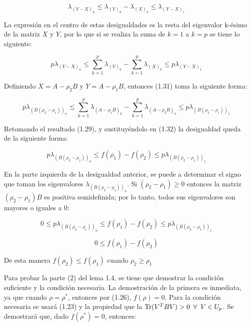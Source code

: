 \begin{equation*}
		\lambda_{(Y-X)_n} \leq \lambda_{(Y)_k} - \lambda_{(X)_k} \leq \lambda_{(Y-X)_1}
\end{equation*}

La expresión en el centro de estas desigualdades es la resta del eigenvalor k-ésimo de la matriz $X$ y $Y$, por lo que si se realiza la suma de $k = 1$ a $k = p$ se tiene lo siguiente:

\begin{equation}\label{eq:2.32}
		p \lambda_{(Y-X)_n} \leq \sum_{k=1}^{p} \lambda_{(Y)_k} - \sum_{k=1}^{p} \lambda_{(X)_k} \leq  p \lambda_{(Y-X)_1}
\end{equation}

Definiendo $X = A - \rho_2 B$ y $Y = A - \rho_1 B$, entonces (1.31) toma la siguiente forma:

\begin{equation}\label{eq:2.33}
    p \lambda_{(B(\rho_2-\rho_1))_n} \leq \sum_{k=1}^{p} \lambda_{(A - \rho_1 B)_k} - \sum_{k=1}^{p} \lambda_{(A - \rho_2 B)_k} \leq  p \lambda_{(B(\rho_2-\rho_1))_1}
\end{equation}

Retomando el resultado (1.29), y sustituyéndolo en (1.32) la desigualdad queda de la siguiente forma:

\begin{equation}\label{eq:2.34}
		p \lambda_{(B (\rho_2 - \rho_1))_n} \leq f(\rho_1) - f(\rho_2) \leq  p \lambda_{(B (\rho_2 - \rho_1))_1}
\end{equation}


En la parte izquierda de la desigualdad anterior, se puede a determinar el signo que toman los eigenvalores $\lambda_{(B (\rho_2 - \rho_1))_n}$. 
Si $(\rho_2- \rho_1) \geq 0$ entonces la matriz $(\rho_2 - \rho_1)B$ es positiva semidefinida; por lo tanto, todos sus eigenvalores son mayores o iguales a 0:

\begin{equation*}
	0 \leq p \lambda_{(B (\rho_2 - \rho_1))_n} \leq f(\rho_1) - f(\rho_2) \leq  p \lambda_{(B (\rho_2 - \rho_1))_1}
\end{equation*}
	
\begin{equation}\label{eq:2.35}
	0 \leq f(\rho_1) - f(\rho_2)
\end{equation}

De esta manera $f(\rho_2)  \leq  f(\rho_1) $ cuando $\rho_2 \geq \rho_1$

Para probar la parte (2) del lema 1.4, se tiene que demostrar la condición suficiente y la condición necesaria. La demostración de la primera es inmediata, ya que cuando $\rho = \rho^*$, entonces por (1.26), $f(\rho) = 0$. Para la condición necesaria se usará (1.23) y la propiedad que la $\operatorname{Tr}(V^T B V) >0 \enspace \forall \enspace V \in U_p$. Se demostrará que, dado $f(\rho^*) = 0$, entonces:


